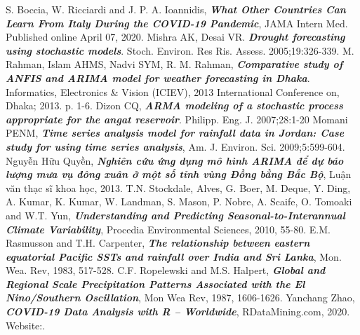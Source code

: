 \documentclass[12pt, a4paper,oneside]{book}
\theoremstyle{definition}
\begin{document}
\begin{thebibliography}{99}
	 S. Boccia, W. Ricciardi and J. P. A. Ioannidis, \textbf{\textit{What Other Countries Can Learn From Italy During the COVID-19 Pandemic}}, JAMA Intern Med. Published online April 07, 2020.
	 Mishra AK, Desai VR. \textit{\textbf{Drought forecasting using stochastic models}}. Stoch. Environ. Res Ris. Assess. 2005;19:326-339.
	 M. Rahman, Islam AHMS, Nadvi SYM, R. M. Rahman, \textit{\textbf{Comparative study of ANFIS and ARIMA model for weather forecasting in Dhaka}}. Informatics, Electronics \& Vision (ICIEV), 2013 International Conference on, Dhaka; 2013. p. 1-6.
     Dizon CQ, \textit{\textbf{ARMA modeling of a stochastic process appropriate for the angat reservoir}}. Philipp. Eng. J. 2007;28:1-20
     Momani PENM, \textit{\textbf{Time series analysis model for rainfall data in Jordan: Case study for using time series analysis}}, Am. J. Environ. Sci. 2009;5:599-604.
     Nguyễn Hữu Quyền, \textit{\textbf{Nghiên cứu ứng dụng mô hình ARIMA để dự báo lượng mưa vụ đông xuân ở một số tỉnh vùng Đồng bằng Bắc Bộ}}, Luận văn thạc sĩ khoa học, 2013.		
	 T.N. Stockdale, Alves, G. Boer, M. Deque, Y. Ding, A. Kumar, K. Kumar, W. Landman, S. Mason, P. Nobre, A. Scaife, O. Tomoaki and W.T. Yun, \textbf{\textit{Understanding and Predicting Seasonal-to-Interannual Climate Variability}}, Procedia Environmental Sciences, 2010, 55-80.
	 E.M. Rasmusson and T.H. Carpenter, \textbf{\textit{The relationship between eastern equatorial Pacific SSTs and rainfall over India and Sri Lanka}}, Mon. Wea. Rev, 1983, 517-528.
	 C.F. Ropelewski and M.S. Halpert, \textbf{\textit{Global and Regional Scale Precipitation Patterns Associated with the El Nino/Southern Oscillation}}, Mon Wea Rev, 1987, 1606-1626.
	 Yanchang Zhao, \textbf{\textit{COVID-19 Data Analysis with R – Worldwide}}, RDataMining.com, 2020.	
	 Website:.
	

		
\end{thebibliography}	
\end{document}
